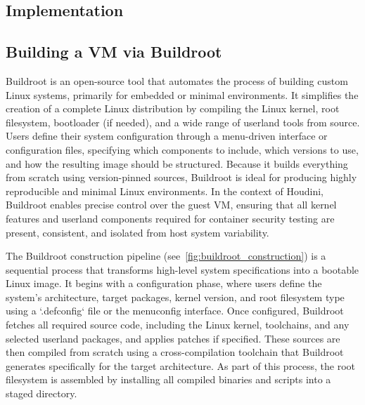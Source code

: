 \documentclass[12pt]{report}
\begin{document}
\begin{doublespace}
\chapter{Implementation}

\section{Building a VM via Buildroot}


Buildroot is an open-source tool that automates the process of building custom Linux systems, primarily for embedded or minimal environments. It simplifies the creation of a complete Linux distribution by compiling the Linux kernel, root filesystem, bootloader (if needed), and a wide range of userland tools from source. Users define their system configuration through a menu-driven interface or configuration files, specifying which components to include, which versions to use, and how the resulting image should be structured. Because it builds everything from scratch using version-pinned sources, Buildroot is ideal for producing highly reproducible and minimal Linux environments. In the context of Houdini, Buildroot enables precise control over the guest VM, ensuring that all kernel features and userland components required for container security testing are present, consistent, and isolated from host system variability.

The Buildroot construction pipeline (see~\ref{fig:buildroot_construction}) is a sequential process that transforms high-level system specifications into a bootable Linux image. It begins with a configuration phase, where users define the system's architecture, target packages, kernel version, and root filesystem type using a `.defconfig` file or the menuconfig interface. Once configured, Buildroot fetches all required source code, including the Linux kernel, toolchains, and any selected userland packages, and applies patches if specified. These sources are then compiled from scratch using a cross-compilation toolchain that Buildroot generates specifically for the target architecture. As part of this process, the root filesystem is assembled by installing all compiled binaries and scripts into a staged directory. 



\end{doublespace}
\end{document}
